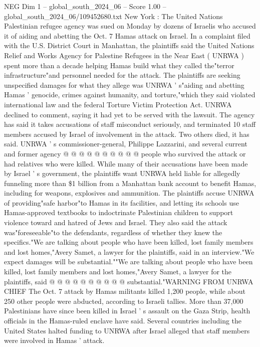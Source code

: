 \begin{textsample}{NEG Dim 1 – global\_south\_2024\_06 – Score 1.00 – global\_south\_2024\_06/109452680.txt}  \label{ex:f1_neg_320}
New York : The United Nations Palestinian refugee agency was sued on Monday by dozens of Israelis who accused it of aiding and abetting the Oct. 7 Hamas attack on Israel.
In a complaint filed with the U.S.
District Court in Manhattan, the plaintiffs said the United Nations Relief and Works Agency for Palestine Refugees in the Near East ( UNRWA ) spent more than a decade helping Hamas build what they called the"terror infrastructure"and personnel needed for the attack.
The plaintiffs are seeking unspecified damages for what they allege was UNRWA ' s"aiding and abetting Hamas ' genocide, crimes against humanity, and torture,"which they said violated international law and the federal Torture Victim Protection Act.
UNRWA declined to comment, saying it had yet to be served with the lawsuit.
The agency has said it takes accusations of staff misconduct seriously, and terminated 10 staff members accused by Israel of involvement in the attack.
Two others died, it has said.
UNRWA ' s commissioner-general, Philippe Lazzarini, and several current and former agency @ @ @ @ @ @ @ @ @ @ people who survived the attack or had relatives who were killed.
While many of their accusations have been made by Israel ' s government, the plaintiffs want UNRWA held liable for allegedly funneling more than \$1 billion from a Manhattan bank account to benefit Hamas, including for weapons, explosives and ammunition.
The plaintiffs accuse UNRWA of providing"safe harbor"to Hamas in its facilities, and letting its schools use Hamas-approved textbooks to indoctrinate Palestinian children to support violence toward and hatred of Jews and Israel.
They also said the attack was"foreseeable"to the defendants, regardless of whether they knew the specifics."We are talking about people who have been killed, lost family members and lost homes,"Avery Samet, a lawyer for the plaintiffs, said in an interview."We expect damages will be substantial.""We are talking about people who have been killed, lost family members and lost homes,"Avery Samet, a lawyer for the plaintiffs, said @ @ @ @ @ @ @ @ @ @ substantial."WARNING FROM UNRWA CHIEF The Oct. 7 attack by Hamas militants killed 1,200 people, while about 250 other people were abducted, according to Israeli tallies.
More than 37,000 Palestinians have since been killed in Israel ' s assault on the Gaza Strip, health officials in the Hamas-ruled enclave have said.
Several countries including the United States halted funding to UNRWA after Israel alleged that staff members were involved in Hamas ' attack.

\end{textsample}
